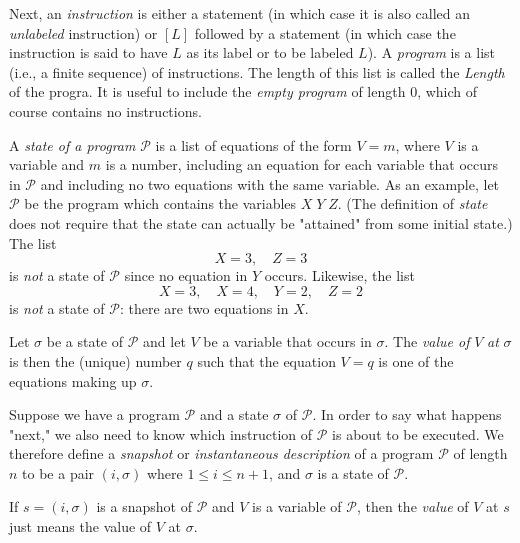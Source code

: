 \documentclass[12pt,a4paper,twoside,openany]{book}
\begin{document}
Next, an \textit{instruction} is either a statement (in which case it is also called an \textit{unlabeled} instruction) or $[L]$ followed by a statement (in which case the instruction is said to have $L$ as its label or to be labeled $L$). A \textit{program} is a list (i.e., a finite sequence) of instructions. The length of this list is called the \textit{Length} of the progra. It is useful to include the \textit{empty program} of length 0, which of course contains no instructions.

A \textit{state of a program} $\mathscr{P}$ is a list of equations of the form $V=m$, where $V$ is a variable and $m$ is a number, including an equation for each variable that occurs in $\mathscr{P}$ and including no two equations with the same variable. As an example, let $\mathscr{P}$ be the program which contains the variables $X\;Y\;Z$. (The definition of \textit{state} does not require that the state can actually be "attained" from some initial state.) The list $$X=3,\quad Z=3$$ is \textit{not} a state of $\mathscr{P}$ since no equation in $Y$ occurs. Likewise, the list $$X=3,\quad X=4,\quad Y=2,\quad Z=2$$ is \textit{not} a state of $\mathscr{P}$: there are two equations in $X$.

Let $\sigma$ be a state of $\mathscr{P}$ and let $V$ be a variable that occurs in $\sigma$. The \textit{value of} $V$ \textit{at} $\sigma$ is then the (unique) number $q$ such that the equation $V=q$ is one of the equations making up $\sigma$.

Suppose we have a program $\mathscr{P}$ and a state $\sigma$ of $\mathscr{P}$. In order to say what happens "next," we also need to know which instruction of $\mathscr{P}$ is about to be executed. We therefore define a \textit{snapshot} or \textit{instantaneous description} of a program $\mathscr{P}$ of length $n$ to be a pair $(i,\sigma)$ where $1\le i\le n+1$, and $\sigma$ is a state of $\mathscr{P}$.

If $s=(i,\sigma)$ is a snapshot of $\mathscr{P}$ and $V$ is a variable of $\mathscr{P}$, then the \textit{value} of $V$ at $s$ just means the value of $V$ at $\sigma$.
\end{document}
